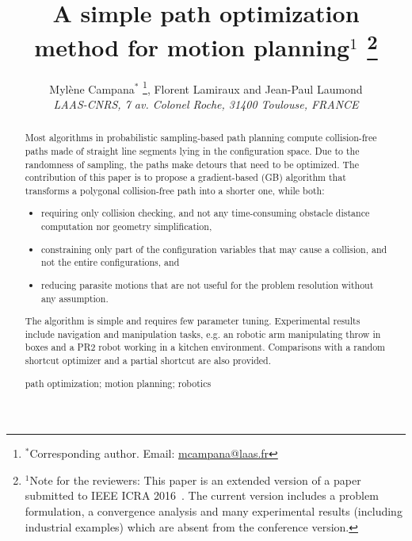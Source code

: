 \documentclass{tADR2e}
\begin{document}
\graphicspath{{images/}}



\title{A simple path optimization method for motion planning$^{1}$ \thanks{$^{1}$Note for the reviewers: This paper is an extended version of a paper submitted to IEEE ICRA 2016~\cite{pathOptimICRA_HAL}. The current version includes a problem formulation, a convergence analysis and many experimental results (including industrial examples) which are absent from the conference version.}}	

\author{Myl\`{e}ne Campana$^{\ast}$ \thanks{$^\ast$Corresponding author. Email: \href{mailto:mcampana@laas.fr}{mcampana@laas.fr}}, Florent Lamiraux and Jean-Paul Laumond
\\\vspace{6pt}
{\em{LAAS-CNRS, 7 av. Colonel Roche, 31400 Toulouse, FRANCE}}
}
\maketitle



\begin{abstract}
Most algorithms in probabilistic sampling-based path planning compute 
collision-free paths made of straight line segments lying in the configuration 
space. Due
to the randomness of sampling, the paths make detours that need to be optimized.
The contribution of this paper is to propose a gradient-based (GB) algorithm that
transforms a polygonal collision-free path into a shorter one, while both:
\begin{itemize}
\item requiring only collision checking, and not any time-consuming obstacle distance computation nor geometry simplification,
\item constraining only part of the configuration variables that may cause a 
collision, and not the entire configurations, and
\item reducing parasite motions that are not useful for the problem resolution without any assumption.
\end{itemize}
The algorithm is simple and requires few parameter tuning. Experimental
results include navigation and manipulation tasks, e.g. an robotic arm 
manipulating throw in boxes and a PR2 robot working in a kitchen environment. 
Comparisons with a random shortcut optimizer and a partial shortcut are also provided.

\medskip

\begin{keywords}path optimization; motion planning; robotics
\end{keywords}\medskip

\end{abstract}
\end{document}
